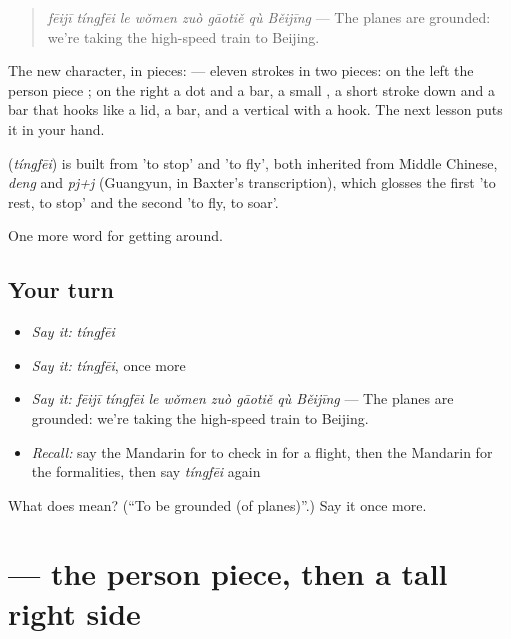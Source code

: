 \begin{quote}
\emph{fēijī tíngfēi le wǒmen zuò gāotiě qù Běijīng} — The planes are grounded: we're taking the high-speed train to Beijing.
\end{quote}

The new character, in pieces:  — eleven strokes in two pieces: on the left the person piece ; on the right a dot and a bar, a small , a short stroke down and a bar that hooks like a lid, a bar, and a vertical with a hook. The next lesson puts it in your hand.

\begin{cousinweb}
\textbf{} (\emph{tíngfēi}) is built from  'to stop' and  'to fly', both inherited from Middle Chinese, \emph{deng} and \emph{pj+j} (Guangyun, in Baxter's transcription), which glosses the first 'to rest, to stop' and the second 'to fly, to soar'.
\end{cousinweb}

\begin{grammarlens}[title={What you've built}]
One more word for getting around.
\end{grammarlens}

\subsection*{Your turn}
\begin{itemize}
\raggedright
  \item \emph{Say it:} \emph{tíngfēi}
  \item \emph{Say it:} \emph{tíngfēi}, once more
  \item \emph{Say it:} \emph{fēijī tíngfēi le wǒmen zuò gāotiě qù Běijīng} — The planes are grounded: we're taking the high-speed train to Beijing.
  \item \emph{Recall:} say the Mandarin for to check in for a flight, then the Mandarin for the formalities, then say \emph{tíngfēi} again
\end{itemize}

\begin{tcolorbox}[breakable,colback=teal!4,colframe=teal!35!black,title={Before you move on}]
What does  mean? (\textquotedblleft{}To be grounded (of planes)\textquotedblright{}.) Say it once more.
\end{tcolorbox}
\section[\texorpdfstring{\zh{停} (tíng)}{停 (tíng)}]{ — the person piece, then a tall right side}

